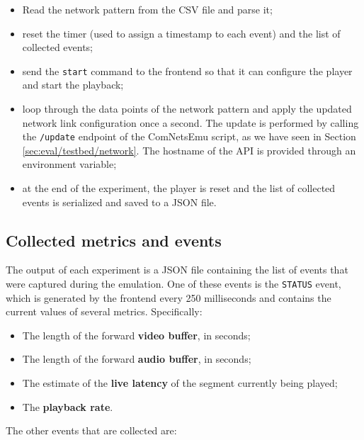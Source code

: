 \begin{itemize}
    \item Read the network pattern from the CSV file and parse it;
    \item reset the timer (used to assign a timestamp to each event) and the list of collected events;
    \item send the \texttt{start} command to the frontend so that it can configure the player and start the playback;
    \item loop through the data points of the network pattern and apply the updated network link configuration once a second. The update is performed by calling the \texttt{/update} endpoint of the ComNetsEmu script, as we have seen in Section \ref{sec:eval/testbed/network}. The hostname of the API is provided through an environment variable;
    \item at the end of the experiment, the player is reset and the list of collected events is serialized and saved to a JSON file.
\end{itemize}

\subsection{Collected metrics and events}
\label{sec:eval/testbed/metrics}

The output of each experiment is a JSON file containing the list of events that were captured during the emulation. One of these events is the \texttt{STATUS} event, which is generated by the frontend every 250 milliseconds and contains the current values of several metrics. Specifically:

\begin{itemize}
    \item The length of the forward \textbf{video buffer}, in seconds;
    \item The length of the forward \textbf{audio buffer}, in seconds;
    \item The estimate of the \textbf{live latency} of the segment currently being played;
    \item The \textbf{playback rate}.
\end{itemize}

The other events that are collected are:

